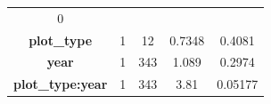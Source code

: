 \documentclass[]{article}
\begin{document}
\begin{longtable}[c]{@{}ccccc@{}}
\begin{minipage}[t]{0.12\columnwidth}
0
\strut\end{minipage}\tabularnewline
\begin{minipage}[t]{0.25\columnwidth}\centering\strut
\textbf{plot\_type}
\strut\end{minipage} &
\begin{minipage}[t]{0.10\columnwidth}\centering\strut
1
\strut\end{minipage} &
\begin{minipage}[t]{0.10\columnwidth}\centering\strut
12
\strut\end{minipage} &
\begin{minipage}[t]{0.12\columnwidth}\centering\strut
0.7348
\strut\end{minipage} &
\begin{minipage}[t]{0.12\columnwidth}\centering\strut
0.4081
\strut\end{minipage}\tabularnewline
\begin{minipage}[t]{0.25\columnwidth}\centering\strut
\textbf{year}
\strut\end{minipage} &
\begin{minipage}[t]{0.10\columnwidth}\centering\strut
1
\strut\end{minipage} &
\begin{minipage}[t]{0.10\columnwidth}\centering\strut
343
\strut\end{minipage} &
\begin{minipage}[t]{0.12\columnwidth}\centering\strut
1.089
\strut\end{minipage} &
\begin{minipage}[t]{0.12\columnwidth}\centering\strut
0.2974
\strut\end{minipage}\tabularnewline
\begin{minipage}[t]{0.25\columnwidth}\centering\strut
\textbf{plot\_type:year}
\strut\end{minipage} &
\begin{minipage}[t]{0.10\columnwidth}\centering\strut
1
\strut\end{minipage} &
\begin{minipage}[t]{0.10\columnwidth}\centering\strut
343
\strut\end{minipage} &
\begin{minipage}[t]{0.12\columnwidth}\centering\strut
3.81
\strut\end{minipage} &
\begin{minipage}[t]{0.12\columnwidth}\centering\strut
0.05177
\strut\end{minipage}\tabularnewline
\bottomrule
\end{longtable}
\end{document}
